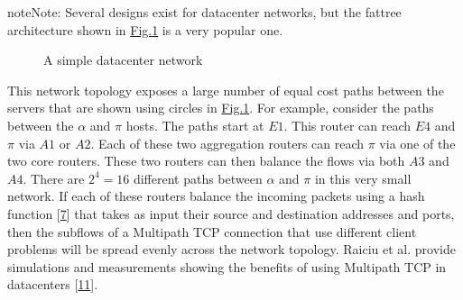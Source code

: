 \documentclass[letterpaper,10pt,english]{sphinxmanual}
\begin{document}
\begin{sphinxadmonition}{note}{Note:}
\sphinxAtStartPar
Several designs exist for datacenter networks, but the fat\sphinxhyphen{}tree architecture shown in \hyperref[\detokenize{mptcp:fig-fat-tree}]{Fig.\@ \ref{\detokenize{mptcp:fig-fat-tree}}} is a very popular one.
\begin{figure}[H]\centering\capstart {}\caption{A simple datacenter network}\label{\detokenize{mptcp:id57}}\label{\detokenize{mptcp:fig-fat-tree}}\end{figure}
\sphinxAtStartPar
This network topology exposes a large number of equal cost paths between the servers that are shown using circles in \hyperref[\detokenize{mptcp:fig-fat-tree}]{Fig.\@ \ref{\detokenize{mptcp:fig-fat-tree}}}. For example, consider the paths between the \(\alpha\) and \(\pi\) hosts. The paths start at \(E1\). This router can reach \(E4\) and \(\pi\) via \(A1\) or \(A2\). Each of these two aggregation routers can reach \(\pi\) via one of the two core routers. These two routers can then balance the flows via both \(A3\) and \(A4\). There are \(2^{4}=16\) different paths between \(\alpha\) and \(\pi\) in this very small network. If each of these routers balance the incoming packets using a hash function {[}\hyperlink{cite.biblio:id2922}{7}{]} that takes as input their source and destination addresses and ports, then the subflows of a Multipath TCP connection that use different client problems will be spread evenly across the network topology.  Raiciu et al. provide simulations and measurements showing the benefits of using Multipath TCP in datacenters {[}\hyperlink{cite.biblio:id8933}{11}{]}.
\end{sphinxadmonition}
\end{document}
